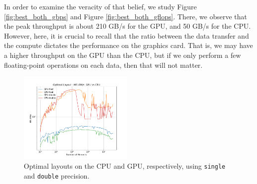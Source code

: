 \documentclass[10pt]{article}
\begin{document}
In order to examine the veracity of that belief, we study Figure \ref{fig:best_both_gbps} and Figure \ref{fig:best_both_gflops}. There, we observe that the peak throughput is about 210 GB/s for the GPU, and 50 GB/s for the CPU. However, here, it is crucial to recall that the ratio between the data transfer and the compute dictates the performance on the graphics card. That is, we may have a higher throughput on the GPU than the CPU, but if we only perform a few floating-point operations on each data, then that will not matter.
\begin{figure}[!ht]
    \centering
    \includegraphics[width=0.49\textwidth]{figs/best_both_melems.png}
    \caption{Optimal layouts on the CPU and GPU, respectively, using \texttt{single} and \texttt{double} precision.}
    \label{fig:best_both_melems}
\end{figure}
\end{document}
